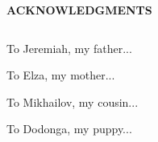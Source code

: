 \begin{center}
\textbf{ACKNOWLEDGMENTS}
\end{center}
$\!$\\
\par 
To Jeremiah, my father...
\par
To Elza, my mother...
\par
To Mikhailov, my cousin...
\par
To Dodonga, my puppy...